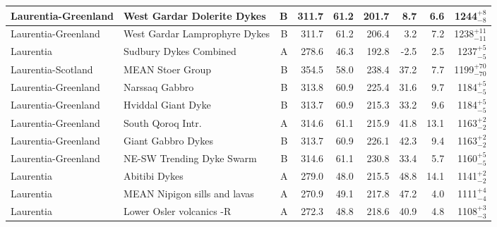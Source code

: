 \begin{longtable}{p{1 in}p{1 in}rrrrrrr}
           Laurentia-Greenland &                         West Gardar Dolerite Dykes &      B &     311.7 &      61.2 & 201.7 &   8.7 &       6.6 &     1244$^{+8}_{-8}$ \\ \hline
           Laurentia-Greenland &                      West Gardar Lamprophyre Dykes &      B &     311.7 &      61.2 & 206.4 &   3.2 &       7.2 &   1238$^{+11}_{-11}$ \\ \hline
                     Laurentia &                             Sudbury Dykes Combined &      A &     278.6 &      46.3 & 192.8 &  -2.5 &       2.5 &     1237$^{+5}_{-5}$ \\ \hline
            Laurentia-Scotland &                                   MEAN Stoer Group &      B &     354.5 &      58.0 & 238.4 &  37.2 &       7.7 &   1199$^{+70}_{-70}$ \\ \hline
           Laurentia-Greenland &                                     Narssaq Gabbro &      B &     313.8 &      60.9 & 225.4 &  31.6 &       9.7 &     1184$^{+5}_{-5}$ \\ \hline
           Laurentia-Greenland &                                 Hviddal Giant Dyke &      B &     313.7 &      60.9 & 215.3 &  33.2 &       9.6 &     1184$^{+5}_{-5}$ \\ \hline
           Laurentia-Greenland &                                  South Qoroq Intr. &      A &     314.6 &      61.1 & 215.9 &  41.8 &      13.1 &     1163$^{+2}_{-2}$ \\ \hline
           Laurentia-Greenland &                                 Giant Gabbro Dykes &      B &     313.7 &      60.9 & 226.1 &  42.3 &       9.4 &     1163$^{+2}_{-2}$ \\ \hline
           Laurentia-Greenland &                          NE-SW Trending Dyke Swarm &      B &     314.6 &      61.1 & 230.8 &  33.4 &       5.7 &     1160$^{+5}_{-5}$ \\ \hline
                     Laurentia &                                      Abitibi Dykes &      A &     279.0 &      48.0 & 215.5 &  48.8 &      14.1 &     1141$^{+2}_{-2}$ \\ \hline
                     Laurentia &                       MEAN Nipigon sills and lavas &      A &     270.9 &      49.1 & 217.8 &  47.2 &       4.0 &     1111$^{+4}_{-4}$ \\ \hline
                     Laurentia &                           Lower Osler volcanics -R &      A &     272.3 &      48.8 & 218.6 &  40.9 &       4.8 &     1108$^{+3}_{-3}$ \\ \hline

\end{longtable}
